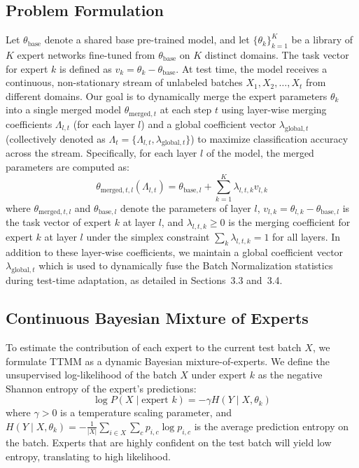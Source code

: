 \documentclass{article}
\theoremstyle{plain}
\theoremstyle{definition}
\theoremstyle{remark}
\begin{document}
\subsection{Problem Formulation}\vspace{-0.1in}
Let $\theta_{\text{base}}$ denote a shared base pre-trained model, and let $\{\theta_k\}_{k=1}^K$
be a library of $K$ expert networks fine-tuned from $\theta_{\text{base}}$ on $K$ distinct domains.
The task vector for expert $k$ is defined as $v_k = \theta_k - \theta_{\text{base}}$. At test time,
the model receives a continuous, non-stationary stream of unlabeled batches $X_1, X_2, \dots, X_t$
from different domains. Our goal is to dynamically merge the expert parameters $\theta_k$ into a
single merged model $\theta_{\text{merged},t}$ at each step $t$ using layer-wise merging
coefficients $\Lambda_{l,t}$ (for each layer $l$) and a global coefficient vector
$\lambda_{\text{global},t}$ (collectively denoted as $\Lambda_t = \{\Lambda_{l,t},
\lambda_{\text{global},t}\}$) to maximize classification accuracy across the stream. Specifically,
for each layer $l$ of the model, the merged parameters are computed as:
\begin{equation}
\theta_{\text{merged},t,l}(\Lambda_{l,t}) = \theta_{\text{base},l} + \sum_{k=1}^K \lambda_{l,t,k}
v_{l,k}
\end{equation}
where $\theta_{\text{merged},t,l}$ and $\theta_{\text{base},l}$ denote the parameters of layer $l$,
$v_{l,k} = \theta_{l,k} - \theta_{\text{base},l}$ is the task vector of expert $k$ at layer $l$, and
$\lambda_{l,t,k} \ge 0$ is the merging coefficient for expert $k$ at layer $l$ under the simplex
constraint $\sum_k \lambda_{l,t,k} = 1$ for all layers. In addition to these layer-wise
coefficients, we maintain a global coefficient vector $\lambda_{\text{global},t}$ which is used to
dynamically fuse the Batch Normalization statistics during test-time adaptation, as detailed in
Sections~3.3 and~3.4.

\subsection{Continuous Bayesian Mixture of Experts}\vspace{-0.1in}
To estimate the contribution of each expert to the current test batch $X$, we formulate TTMM as a
dynamic Bayesian mixture-of-experts. We define the unsupervised log-likelihood of the batch $X$
under expert $k$ as the negative Shannon entropy of the expert's predictions:
\begin{equation}
    \log P(X \mid \text{expert } k) = -\gamma H(Y \mid X, \theta_k)
\end{equation}
where $\gamma > 0$ is a temperature scaling parameter, and $H(Y \mid X, \theta_k) = -\frac{1}{|X|}
\sum_{i \in X} \sum_{c} p_{i,c} \log p_{i,c}$ is the average prediction entropy on the batch.
Experts that are highly confident on the test batch will yield low entropy, translating to high
likelihood.
\end{document}
